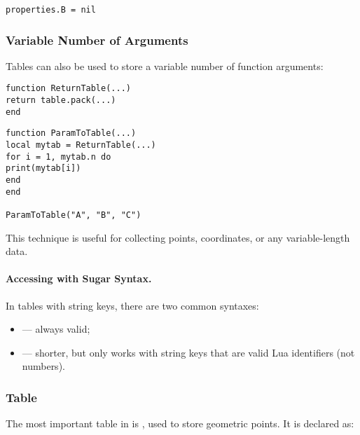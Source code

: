 \begin{verbatim}
properties.B = nil
\end{verbatim}

\subsubsection{Variable Number of Arguments} %
\label{ssub:varargs_table}

Tables can also be used to store a variable number of function arguments:

\begin{mybox}
\begin{verbatim}
function ReturnTable(...)
return table.pack(...)
end
\end{verbatim}
\end{mybox}

\begin{mybox}
\begin{verbatim}
function ParamToTable(...)
local mytab = ReturnTable(...)
for i = 1, mytab.n do
print(mytab[i])
end
end

ParamToTable("A", "B", "C")
\end{verbatim}
\end{mybox}

This technique is useful for collecting points, coordinates, or any variable-length data.

\paragraph{Accessing with Sugar Syntax.}
In tables with string keys, there are two common syntaxes:

\begin{itemize}
\item {} — always valid;
\item {} — shorter, but only works with string keys that are valid Lua identifiers (not numbers).
\end{itemize}


\subsubsection{Table } %
\label{ssub:table_z}

The most important table in  is , used to store geometric points. It is declared as:

